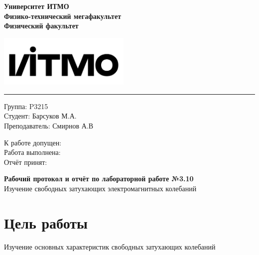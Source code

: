 \documentclass[14pt]{extarticle}
\begin{document}
    \begin{minipage}{0.5\textwidth}
        \begin{center}
            \begin{small}
                \textsf{\textbf{Университет ИТМО}} \\
                \textsf{\textbf{Физико-технический мегафакультет}} \\
                \textsf{\textbf{Физический факультет}}
            \end{small}
        \end{center}
    \end{minipage}
    \hfill
    \begin{minipage}{0.4\textwidth}
        \includegraphics[height=2.5cm]{img/itmo.png}
    \end{minipage}
    \hrule
    \vspace{8mm}
    \begin{minipage}{0.4\textwidth}
        Группа: P3215 \\ %
        Студент: Барсуков М.А. \\ %
        Преподаватель: Смирнов А.В %
    \end{minipage}
    \hfill
    \begin{minipage}{0.4\textwidth}
        К работе допущен: \\
        Работа выполнена: \\
        Отчёт принят: 
    \end{minipage}
    \vspace{8mm}
    \begin{center}
        \begin{Large}
            \textbf{Рабочий протокол и отчёт по лабораторной работе №3.10} \\ %
            Изучение свободных затухающих электромагнитных колебаний %
        \end{Large}
    \end{center}
    \vspace{8mm}
 
    \section{Цель работы}
    Изучение основных характеристик свободных затухающих колебаний
    
\end{document}
